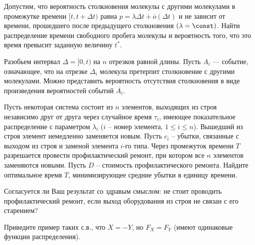 

\begin{problem}
Допустим, что вероятность столкновения молекулы с другими молекулами в промежутке времени $[t,t + \Delta t)$ 
равна $p = \lambda\Delta t+{\overline o}(\Delta t)$ и не зависит от времени, прошедшего после предыдущего столкновения $(\lambda = \const)$. 
Найти распределение времени свободного пробега молекулы и вероятность того, что это время превысит заданную величину $t^*$. 
\end{problem}

\begin{ordre}
Разобьем интервал $\Delta=[0,t)$ на $n$ отрезков равной длины.
Пусть $A_i$ --- событие, означающее, что на отрезке $\Delta_i$  молекула претерпит столкновение с другими молекулами. Можно представить вероятность отсутствия столкновения в виде произведения вероятностей событий $\overline{A_i}$.
\end{ordre}

\begin{problem} 
Пусть некоторая система состоит из $n$ элементов, выходящих из строя независимо друг от друга через случайное время $\tau _{i} $, имеющее показательное распределение с параметром $\lambda _{i} $ ($i$ -- номер элемента, $1\le i\le n$). Вышедший из строя элемент немедленно заменяется новым. Пусть $c_{i} $ -- убытки, связанные с выходом из строя и заменой элемента $i$-го типа. Через промежуток времени $T$ разрешается провести профилактический ремонт, при котором все $n$ элементов заменяются новыми. Пусть $D$ -- стоимость профилактического ремонта. Найдите оптимальное время $T$, минимизирующее средние убытки в единицу времени.
\end{problem}

\begin{remark} 
Согласуется ли Ваш результат со здравым смыслом: не стоит проводить профилактический ремонт, если выход оборудования из строя не связан с его старением?
\end{remark}



\begin{problem}
Приведите пример таких с.в., что $X=-Y$, но $F_X=F_Y$  (имеют одинаковые  функции распределения).
\end{problem}

